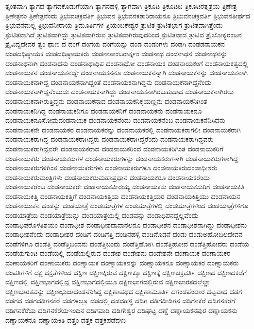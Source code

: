 {ತ್ಯಂತವಾಗಿ
ತ್ಯಾಗದ
ತ್ಯಾಗದಕೊಡುಗೆಯಾಗಿ
ತ್ಯಾಗನಹಳ್ಳಿ
ತ್ಯಾಗವಾಗಿ
ತ್ರಿಕೂಟ
ತ್ರಿಕೂಟಬ
ತ್ರಿಕೂಟರತ್ನತ್ರಯ
ತ್ರಿಣೇತ್ರ
ತ್ರಿಣೇತ್ರನಂ
ತ್ರಿಣೇತ್ರನೆಂದು
ತ್ರಿಭುವಚಕ್ರವರ್ತಿ
ತ್ರಿಭುವನ
ತ್ರಿಭುವನಕಠಾರಿರಾಯನೂ
ತ್ರಿಭುವನಚಕ್ರವರ್ತಿ
ತ್ರಿಭುವನತೀರ್ಥದ
ತ್ರಿಭುವನಮಲ್ಲ
ತ್ರಿಭುವನೀರಾಯ
ತ್ರಿಮೂರ್ತಿಗಳ
ತ್ರಿಯಂಬಕೇಶ್ವರ
ತ್ರುಟಿತ
ತ್ರುಟಿತಭಾಗ
ತ್ರುಟಿತವಾಗಿತ್ತೆಂದು
ತ್ರುಟಿತವಾಗಿದೆ
ತ್ರುಟಿತವಾಗಿದ್ದು
ತ್ರುಟಿತವಾಗಿರುವ
ತ್ರುಟಿತವಾಗಿರುವುದರಿಂದ
ತ್ರುಟಿತವಾದ
ತ್ರುಟಿದ
ತ್ರೈಲೋಕ್ಯರಂಜನ
ತ್ರೈವಿದ್ಯದೇವರ
ತ್ವಂ
ಥಾಣ
ದ
ದಂಗೆ
ದಂಗೆಯ
ದಂಗೆಯನ್ನು
ದಂಡ
ದಂಡಂಗಳು
ದಂಡಗಿ
ದಂಡಡನಾಯಕನ
ದಂಡದಧಿಷ್ಠಾಯಕ
ದಂಡದಧಿಷ್ಠಾಯಕರು
ದಂಡನಾತಾಂಬರಾರ್ಕ್ಕಂ
ದಂಡನಾಥ
ದಂಡನಾಥನ
ದಂಡನಾಥನನ್ನು
ದಂಡನಾಥನಾಗಿ
ದಂಡನಾಥನು
ದಂಡನಾಥಾಧಿಪ
ದಂಡನಾಥೋ
ದಂಡನಾಯಕ
ದಂಡನಾಯಕಂಗೆ
ದಂಡನಾಯಕತ್ವದಲ್ಲಿ
ದಂಡನಾಯಕನ
ದಂಡನಾಯಕನದ್ದೇ
ದಂಡನಾಯಕನನೂ
ದಂಡನಾಯಕನನ್ನಾಗಿ
ದಂಡನಾಯಕನನ್ನು
ದಂಡನಾಯಕನಾಗಿ
ದಂಡನಾಯಕನಾಗಿದ್ದ
ದಂಡನಾಯಕನಾಗಿದ್ದಂತೆ
ದಂಡನಾಯಕನಾಗಿದ್ದನು
ದಂಡನಾಯಕನಾಗಿದ್ದನೆಂದು
ದಂಡನಾಯಕನಾಗಿದ್ದನೆಂಬುದು
ದಂಡನಾಯಕನಾಗಿದ್ದು
ದಂಡನಾಯಕನಾಗಿರಬಹುದಾದ
ದಂಡನಾಯಕನಾಗಿರಲು
ದಂಡನಾಯಕನಾಗಿರುತ್ತಿದ್ದನು
ದಂಡನಾಯಕನಾದ
ದಂಡನಾಯಕನಿಕ್ಕಯಣ್ಣನು
ದಂಡನಾಯಕನಿಗಿಂತ
ದಂಡನಾಯಕನಿಗಿದ್ದ
ದಂಡನಾಯಕನಿಗೂ
ದಂಡನಾಯಕನಿಗೆ
ದಂಡನಾಯಕನು
ದಂಡನಾಯಕನೂ
ದಂಡನಾಯಕನೂಸೋಮದಂಡನಾಯಕ
ದಂಡನಾಯಕನೆಂದು
ದಂಡನಾಯಕನೆಂಬ
ದಂಡನಾಯಕನೆನಿಸಿದನು
ದಂಡನಾಯಕನೇ
ದಂಡನಾಯಕರ
ದಂಡನಾಯಕರನ್ನು
ದಂಡನಾಯಕರಲ್ಲಿ
ದಂಡನಾಯಕರಾಗಲೀ
ದಂಡನಾಯಕರಾಗಿ
ದಂಡನಾಯಕರಾಗಿದ್ದ
ದಂಡನಾಯಕರಾಗಿದ್ದರು
ದಂಡನಾಯಕರಾಗಿದ್ದರೆಂದು
ದಂಡನಾಯಕರಾಗಿದ್ದವರು
ದಂಡನಾಯಕರಾಗಿದ್ದವರೇ
ದಂಡನಾಯಕರಾದ
ದಂಡನಾಯಕರಿಂದ
ದಂಡನಾಯಕರಿಗಿಂತ
ದಂಡನಾಯಕರಿಗೆ
ದಂಡನಾಯಕರು
ದಂಡನಾಯಕರುಗಳ
ದಂಡನಾಯಕರುಗಳನ್ನು
ದಂಡನಾಯಕರುಗಳಾಗಿ
ದಂಡನಾಯಕರುಗಳಾಗಿದ್ದ
ದಂಡನಾಯಕರುಗಳಿಗಿಂತ
ದಂಡನಾಯಕರುಗಳು
ದಂಡನಾಯಕರುಗಳೂ
ದಂಡನಾಯಕರುದಂಡಾಧೀಶರು
ದಂಡನಾಯಕರುಮಂತ್ರಿಗಳು
ದಂಡನಾಯಕರುಮಹಾಪ್ರಧಾನ
ದಂಡನಾಯಕರೂ
ದಂಡನಾಯಕರೆಂದು
ದಂಡನಾಯಕರೆಂಬ
ದಂಡನಾಯಕರೇ
ದಂಡನಾಯಕವೀರಯ್ಯ
ದಂಡನಾಯಕಸು
ದಂಡನಾಯಕಸುರಿಗೆ
ದಂಡನಾಯಕಿತಿ
ದಂಡನಾಯಕಿತ್ತಿ
ದಂಡನಾಯಕಿತ್ತಿಗೆ
ದಂಡನಾಯಕಿತ್ತಿಯ
ದಂಡನಾಯಕಿತ್ತಿಯರ
ದಂಡನಾಯಕಿತ್ತಿಯು
ದಂಡನಾಯನ
ದಂಡನಾಯುಕನ
ದಂಡನ್ನು
ದಂಡಯಾತ್ರೆ
ದಂಡಯಾತ್ರೆಗಳ
ದಂಡಯಾತ್ರೆಗಳಲ್ಲಿ
ದಂಡಯಾತ್ರೆಗಳಿಂದ
ದಂಡಯಾತ್ರೆಗಳಿಗೂ
ದಂಡಯಾತ್ರೆಯ
ದಂಡಯಾತ್ರೆಯನ್ನು
ದಂಡಯಾತ್ರೆಯಲ್ಲಿ
ದಂಡವನ್ನು
ದಂಡಾಧಿಪನದ್ದಲ್ಲವೆಂದು
ದಂಡಾಧಿಪರೊಳತಿಶಯಂ
ದಂಡಾಧೀಶ
ದಂಡಾಧೀಶದಾವಾನಲನೂ
ದಂಡಾಧೀಶನ
ದಂಡಾಧೀಶನಾಗಿದ್ದು
ದಂಡಾಧೀಶನು
ದಂಡಾಧೀಶನೆಂದು
ದಂಡಾಧೀಶರ
ದಂಡಿಗೆ
ದಂಡಿಗೆತ್ತಿ
ದಂಡಿನಹಳ್ಳಿ
ದಂಡಿನೊಡನೆ
ದಂಡು
ದಂಡುಅಹೋಬಲದೇವನ
ದಂಡೆಗಳಿಗೂ
ದಂಡೆತ್ತಿ
ದಂಡೆತ್ತಿಬಂದನು
ದಂಡೆತ್ತಿಬಂದು
ದಂಡೆತ್ತಿಹೋಗಿ
ದಂಡೆತ್ತಿಹೋದ
ದಂಡೆತ್ತಿಹೋದರು
ದಂಡೆಯ
ದಂಡೆಯಗುಂಟ
ದಂಡೆಯಲ್ಲಿ
ದಂಡೆಯಲ್ಲಿರುವ
ದಂಡೇಶ
ದಂಡೇಶನು
ದಂಡೇಶನೇ
ದಂಣಾಯಕ
ದಂಣಾಯಕರ
ದಂಣಾಯಕರಿಗೆ
ದಂಣಾಯಕರು
ದಂಣ್ನಾಯಕ
ದಂಣ್ನಾಯಕನನ್ನು
ದಂಣ್ನಾಯಕನೂ
ದಂಣ್ನಾಯಕರ
ದಂಣ್ನಾಯಕರು
ದಂಪತಿಗಳಿಗೆ
ದಕ್ಷ
ದಕ್ಷತೆಗಳಿಂದ
ದಕ್ಷಿಣ
ದಕ್ಷಿಣಕ್ಕಿರುವ
ದಕ್ಷಿಣಕ್ಕೂ
ದಕ್ಷಿಣಕ್ಕೆ
ದಕ್ಷಿಣಚಕ್ರವರ್ತಿ
ದಕ್ಷಿಣದ
ದಕ್ಷಿಣದಕಡೆಗೆ
ದಕ್ಷಿಣದಲ್ಲಿ
ದಕ್ಷಿಣಭಾಗದಲ್ಲಿದ್ದ
ದಕ್ಷಿಣಭಾಗದಲ್ಲಿಯೂ
ದಕ್ಷಿಣಭಾಗದಲ್ಲಿರುವ
ದಕ್ಷಿಣಭಾರತದಲ್ಲೆಲ್ಲಾ
ದಕ್ಷಿಣಭಾರತವನ್ನು
ದಕ್ಷಿಣಭುಜಾದಂಡನೆನಿಸಿದ್ದ
ದಕ್ಷಿಣಾಪಥದ
ದಕ್ಷಿಣಾಮೂರ್ತಿ
ದಗಂಡಪೆಂಡಾರ
ದಟ್ಟವಾದ
ದಡಗ
ದಡಗದ
ದಡಗದಡಿಗನಕೆರೆ
ದಡಗಳಲ್ಲೂ
ದಡದಲ್ಲಿ
ದಡದಹಳ್ಳಿ
ದಡಿಗ
ದಡಿಗದೀಡಿಗನ
ದಡಿಗನಕೆರೆ
ದಡಿಗನಕೆರೆಗೆ
ದಡಿಗನಕೆರೆಯ
ದಡಿಗನಕೆರೆಯಇಂದಿನ
ದಡಿಗವಾಡಿ
ದಡಿಗೇಶ್ವರ
ದಡಿಘಟ್ಟ
ದಣ್ಡೆ
ದಣ್ಣಾಯಕನಪುರ
ದಣ್ಣಾಯಕನು
ದಣ್ನಾಯಕನೂ
ದಣ್ನಾಯಕಿತಿ
ದತ್ತಂ
ದತ್ತಕ
ದತ್ತಕಪಡೆದಳು
}
